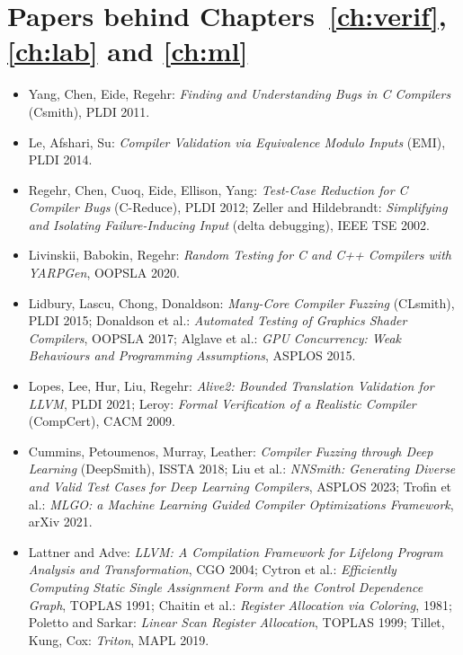 \documentclass[10pt,a4paper,openany,oneside]{report}
\begin{document}
\section{Papers behind Chapters~\ref{ch:verif}, \ref{ch:lab} and \ref{ch:ml}}
\begin{itemize}[nosep]
\item Yang, Chen, Eide, Regehr: \emph{Finding and Understanding Bugs in C Compilers} (Csmith), PLDI 2011.
\item Le, Afshari, Su: \emph{Compiler Validation via Equivalence Modulo Inputs} (EMI), PLDI 2014.
\item Regehr, Chen, Cuoq, Eide, Ellison, Yang: \emph{Test-Case Reduction for C Compiler Bugs} (C-Reduce), PLDI 2012; Zeller and Hildebrandt: \emph{Simplifying and Isolating Failure-Inducing Input} (delta debugging), IEEE TSE 2002.
\item Livinskii, Babokin, Regehr: \emph{Random Testing for C and C++ Compilers with YARPGen}, OOPSLA 2020.
\item Lidbury, Lascu, Chong, Donaldson: \emph{Many-Core Compiler Fuzzing} (CLsmith), PLDI 2015; Donaldson et al.: \emph{Automated Testing of Graphics Shader Compilers}, OOPSLA 2017; Alglave et al.: \emph{GPU Concurrency: Weak Behaviours and Programming Assumptions}, ASPLOS 2015.
\item Lopes, Lee, Hur, Liu, Regehr: \emph{Alive2: Bounded Translation Validation for LLVM}, PLDI 2021; Leroy: \emph{Formal Verification of a Realistic Compiler} (CompCert), CACM 2009.
\item Cummins, Petoumenos, Murray, Leather: \emph{Compiler Fuzzing through Deep Learning} (DeepSmith), ISSTA 2018; Liu et al.: \emph{NNSmith: Generating Diverse and Valid Test Cases for Deep Learning Compilers}, ASPLOS 2023; Trofin et al.: \emph{MLGO: a Machine Learning Guided Compiler Optimizations Framework}, arXiv 2021.
\item Lattner and Adve: \emph{LLVM: A Compilation Framework for Lifelong Program Analysis and Transformation}, CGO 2004; Cytron et al.: \emph{Efficiently Computing Static Single Assignment Form and the Control Dependence Graph}, TOPLAS 1991; Chaitin et al.: \emph{Register Allocation via Coloring}, 1981; Poletto and Sarkar: \emph{Linear Scan Register Allocation}, TOPLAS 1999; Tillet, Kung, Cox: \emph{Triton}, MAPL 2019.
\end{itemize}
\end{document}
